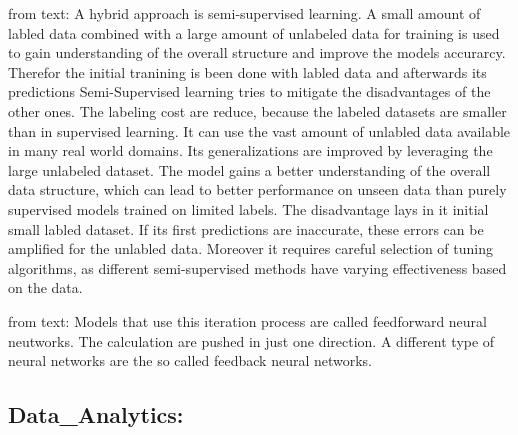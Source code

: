from text: A hybrid approach is semi-supervised learning. 
A small amount of labled data combined with a large amount of unlabeled data for training is used to gain understanding of the overall structure and improve the models accurarcy. 
Therefor the initial tranining is been done with labled data and afterwards its predictions 
Semi-Supervised learning tries to mitigate the disadvantages of the other ones. 
The labeling cost are reduce, because the labeled datasets are smaller than in supervised learning. 
It can use the vast amount of unlabled data available in many real world domains.
Its generalizations are improved by leveraging the large unlabeled dataset. \citep[p.4]{sarker2021machine}
The model gains a better understanding of the overall data structure, which can lead to better performance on unseen data than purely supervised models trained on limited labels. 
The disadvantage lays in it initial small labled dataset. If its first predictions are  inaccurate, these errors can be amplified for the unlabled data.
Moreover it requires careful selection of tuning algorithms, as different semi-supervised methods have varying effectiveness based on the data. 

from text: 
Models that use this iteration process are called feedforward neural neutworks. 
The calculation are pushed in just one direction.
A different type of neural networks are the so called feedback neural networks. 
\subsection{Data_Analytics:}

